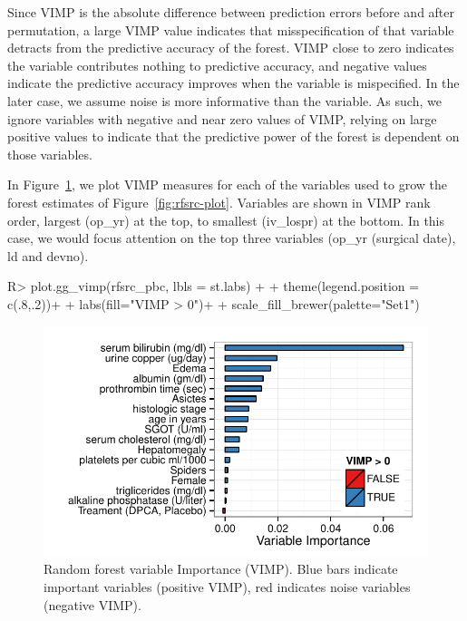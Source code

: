 \documentclass[nojss]{jss}\usepackage[]{graphicx}\usepackage[]{color}
\makeatletter
\def\maxwidth{ %
  \ifdim\Gin@nat@width>\linewidth
    \linewidth
  \else
    \Gin@nat@width
  \fi
}
\makeatother
\begin{document}
Since VIMP is the absolute difference between prediction errors before and after permutation, a large VIMP value indicates that misspecification of that variable detracts from the predictive accuracy of the forest. VIMP close to zero indicates the variable contributes nothing to predictive accuracy, and negative values indicate the predictive accuracy improves when the variable is mispecified. In the later case, we assume noise is more informative than the variable. As such, we ignore variables with negative and near zero values of VIMP, relying on large positive values to indicate that the predictive power of the forest is dependent on those variables. 

In Figure~\ref{fig:rf-vimp}, we plot VIMP measures for each of the variables used to grow the forest estimates of Figure~\ref{fig:rfsrc-plot}. Variables are shown in VIMP rank order, largest (op\_yr) at the top, to smallest (iv\_lospr) at the bottom. In this case, we would focus attention on the top three variables (op\_yr (surgical date), ld and devno).
\begin{Schunk}
\begin{Sinput}
R> plot.gg_vimp(rfsrc_pbc, lbls = st.labs) + 
+   theme(legend.position = c(.8,.2))+
+   labs(fill="VIMP > 0")+
+   scale_fill_brewer(palette="Set1")
\end{Sinput}
\begin{figure}[!htpb]

{\centering \includegraphics[width=\maxwidth]{figure/rfs-rf-vimp-1} 

}

\caption[Random forest variable Importance (VIMP)]{Random forest variable Importance (VIMP). Blue bars indicate important variables (positive VIMP), red indicates noise variables (negative VIMP).\label{fig:rf-vimp}}
\end{figure}
\end{Schunk}
\end{document}
